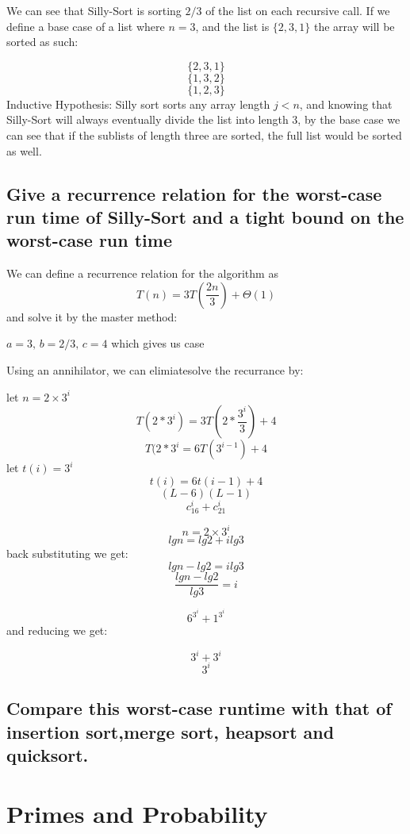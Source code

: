 \documentclass[titlepage]{article}\usepackage[]{graphicx}\usepackage[]{color}
\begin{document}
We can see that Silly-Sort is sorting $2/3$ of the list on each recursive call.
If we define a base case of a list where $n=3$, and the list is $\{ 2,3,1 \} $ the array will be sorted as
such:

\[ \{ 2, 3, 1 \} \] 
  \[ \{ 1, 3, 2 \} \]
  \[ \{ 1, 2, 3 \} \]
Inductive Hypothesis: Silly sort sorts any array length $j<n$, and knowing that
Silly-Sort will always eventually divide the list into length 3, by the base
case we can see that if the sublists of length three are sorted, the full list
would be sorted as well. 


\subsection{ Give a recurrence relation for the worst-case run time of Silly-Sort and a
tight bound on the worst-case run time}

We can define a recurrence relation for the algorithm as 
\[ T(n) = 3T(\frac{2n}{3}) + \Theta(1) \]
and solve it by the master method:

$a = 3, \, b = 2/3, \, c=4$ which gives us case 

Using an annihilator, we can elimiatesolve the recurrance by:

let $n = 2\times3^i$
\[ T(2*3^i) = 3T(2*\frac{3^i}{3}) + 4 \]
\[ T(2*3^i = 6T(3^{i-1}) + 4 \]
let $t(i) = 3^i$
\[ t(i) = 6t(i-1) + 4 \]
\[ (L-6)(L-1) \]
\[ c_16^i + c_21^i \]

\[ n = 2\times3^i \]
\[ lg n = lg2 + i lg3 \] 
back substituting we get:
\[ lg n - lg 2 = i lg3 \]
\[ \frac{lg n - lg 2}{lg 3} = i \]

\[ 6^{3^i} + 1^{3^i} \]
and reducing we get:

\[ 3^i + 3^i \]
\[ 3^i \]

  






\subsection{ Compare this worst-case runtime with that of insertion sort,merge
sort, heapsort and quicksort.}





\section{Primes and Probability}
\end{document}
